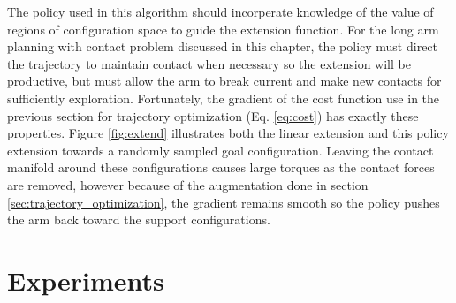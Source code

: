 \documentclass[../thesis.tex]{subfiles}
\begin{document}
The policy used in this algorithm should incorperate knowledge of the value of regions of configuration space to guide the extension function.
For the long arm planning with contact problem discussed in this chapter, the policy must direct the trajectory to maintain contact when necessary so the extension will be productive, but must allow the arm to break current and make new contacts for sufficiently exploration.
Fortunately, the gradient of the cost function use in the previous section for trajectory optimization (Eq. \ref{eq:cost}) has exactly these properties.
Figure \ref{fig:extend} illustrates both the linear extension and this policy extension towards a randomly sampled goal configuration.
Leaving the contact manifold around these configurations causes large torques as the contact forces are removed, however because of the augmentation done in section \ref{sec:trajectory_optimization}, the gradient remains smooth so the policy pushes the arm back toward the support configurations.









\section{Experiments}
\end{document}
